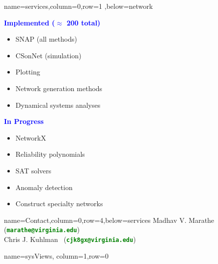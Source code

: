 \documentclass[landscape,paperwidth=70in,paperheight=46in,fontscale=0.225]{baposter} %
\begin{document}
\begin{poster}
          {name=services,column=0,row=1 ,below=network}{
\begin{minipage}[t]{0.48 \textwidth}
\textcolor{blue}{\textbf{Implemented ($\approx$ 200 total)}}
\medskip
\begin{itemize}[leftmargin=*,noitemsep,topsep=0pt]
    \item SNAP (all methods)  \smallskip
    \item CSonNet (simulation)  \smallskip 
    \item Plotting  \smallskip
    \item Network generation methods  \smallskip
    \item Dynamical systems analyses
\end{itemize}
\end{minipage}
\quad
\begin{minipage}[t]{0.48 \textwidth}
\textcolor{blue}{\textbf{In Progress}}\
  \medskip
\begin{itemize}[leftmargin=*,noitemsep,topsep=0pt]
    \item NetworkX    \smallskip
    \item Reliability polynomials    \smallskip
    \item SAT solvers    \smallskip
    \item Anomaly detection     \smallskip
    \item Construct specialty networks    \smallskip
\end{itemize}
\end{minipage}
}

          {name=Contact,column=0,row=4,below=services}{
{\footnotesize
{Madhav V. Marathe~ (\textcolor{green}{\textbf{\texttt{marathe@virginia.edu}}})}\\
{Chris J. Kuhlman~ (\textcolor{green}{\textbf{\texttt{cjk8gx@virginia.edu}}})}
}
\vspace*{-0.01in}
}


          {name=sysViews, column=1,row=0}{

}
\end{poster}
\end{document}
